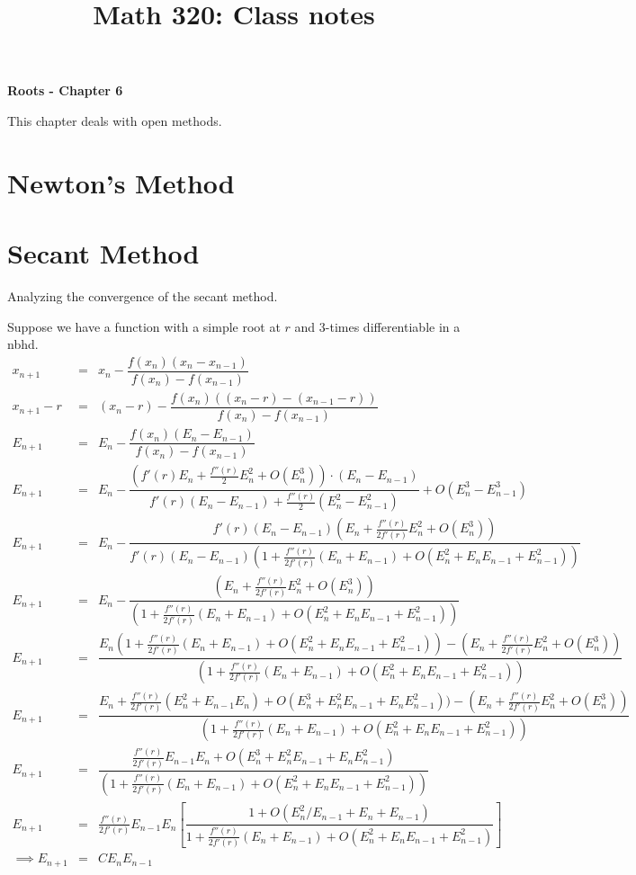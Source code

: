 \documentclass[12pt]{amsart}
\theoremstyle{definition}
\begin{document}
\title{Math 320: Class notes}
\maketitle


{\bf Roots - Chapter 6}

This chapter deals with open methods.

\section{Newton's Method}

\section{Secant Method}

Analyzing the convergence of the secant method.

Suppose we have a function with a simple root at $r$ and 3-times differentiable in a nbhd.
\begin{align*}
 x_{n+1} &= &x_n - \dfrac{f(x_n)(x_n - x_{n-1})}{f(x_n) - f(x_{n-1})}\\
 x_{n+1} - r &= &(x_n - r) - \dfrac{f(x_n)((x_n -r) -  (x_{n-1}- r))}{f(x_n) - f(x_{n-1})}\\
 E_{n+1} &= &E_n - \dfrac{f(x_n)(E_n - E_{n-1})}{f(x_n) - f(x_{n-1})}\\
 E_{n+1} &= &E_n - \dfrac{(f'(r)E_n + \frac{f''(r)}{2} E_n^2 + O(E_n^3))\cdot (E_n - E_{n-1})}{f'(r) (E_n - E_{n-1}) + \frac{f''(r)}{2}(E_n^2 - E_{n-1}^2)} + O(E_n^3-E_{n-1}^3) \\
 E_{n+1} &= &E_n - \dfrac{f'(r)(E_n - E_{n-1})(E_n + \frac{f''(r)}{2f'(r)} E_n^2 + O(E_n^3))}{f'(r)(E_n - E_{n-1})(1  + \frac{f''(r)}{2f'(r)}(E_n + E_{n-1}) + O(E_n^2+ E_n E_{n-1} + E_{n-1}^2))} \\
 E_{n+1} &= &E_n - \dfrac{(E_n + \frac{f''(r)}{2f'(r)} E_n^2 + O(E_n^3))}{(1  + \frac{f''(r)}{2f'(r)}(E_n + E_{n-1}) + O(E_n^2+ E_n E_{n-1} + E_{n-1}^2))} \\
 E_{n+1} &= &\dfrac{E_n(1  + \frac{f''(r)}{2f'(r)}(E_n + E_{n-1}) + O(E_n^2+ E_n E_{n-1} + E_{n-1}^2)) - (E_n + \frac{f''(r)}{2f'(r)} E_n^2 + O(E_n^3))}{(1  + \frac{f''(r)}{2f'(r)}(E_n + E_{n-1}) + O(E_n^2+ E_n E_{n-1} + E_{n-1}^2))} \\
 E_{n+1} &= &\dfrac{E_n  + \frac{f''(r)}{2f'(r)}(E_n^2 + E_{n-1}E_n) + O(E_n^3+ E_n^2 E_{n-1} + E_nE_{n-1}^2)) 
- (E_n + \frac{f''(r)}{2f'(r)} E_n^2 + O(E_n^3))}{(1  + \frac{f''(r)}{2f'(r)}(E_n + E_{n-1}) + O(E_n^2+ E_n E_{n-1} + E_{n-1}^2))} \\
 E_{n+1} &= &\dfrac{\frac{f''(r)}{2f'(r)} E_{n-1}E_n + O(E_n^3+ E_n^2 E_{n-1} + E_nE_{n-1}^2)}{(1  + \frac{f''(r)}{2f'(r)}(E_n + E_{n-1}) + O(E_n^2+ E_n E_{n-1} + E_{n-1}^2))} \\
 E_{n+1} &= &\frac{f''(r)}{2f'(r)} E_{n-1}E_n \left[\dfrac{1 + O(E_n^2/E_{n-1}+ E_n+ E_{n-1})}{1  + \frac{f''(r)}{2f'(r)}(E_n + E_{n-1}) + O(E_n^2+ E_n E_{n-1} + E_{n-1}^2)}\right] \\
\implies E_{n+1} &=& C E_nE_{n-1} 
\end{align*}
\end{document}
